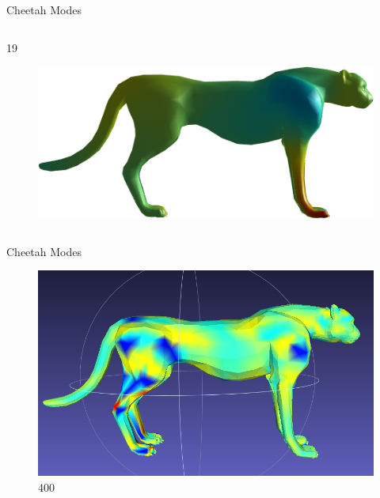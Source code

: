 \documentclass{beamer}
\begin{document}
\begin{frame}{Cheetah Modes}
\begin{columns}
\begin{column}[T]{5cm}
\begin{figure}[t]
\end{figure}
19
\begin{figure}[t]
    \includegraphics[width=\textwidth]{Harmonics/CheetahModes/19.png}
\end{figure}
\end{column}
\end{columns}

\end{frame}


\begin{frame}{Cheetah Modes}

\begin{figure}[t]
    \includegraphics[width=\textwidth]{Cheetah399.png}
    \caption*{\huge 400}
\end{figure}

\end{frame}
\end{document}
